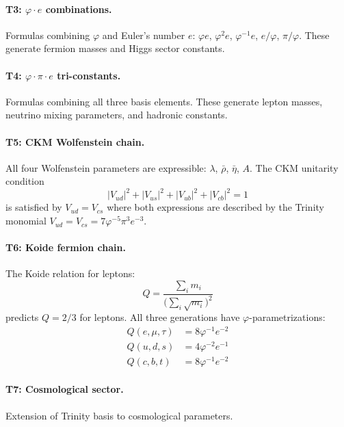 \documentclass{article}
\begin{document}
\paragraph{T3: $\varphi \cdot e$ combinations.}
Formulas combining $\varphi$ and Euler's number $e$:
$\varphi e$, $\varphi^2 e$, $\varphi^{-1}e$, $e/\varphi$, $\pi/\varphi$.
These generate fermion masses and Higgs sector constants.

\paragraph{T4: $\varphi \cdot \pi \cdot e$ tri-constants.}
Formulas combining all three basis elements. These generate lepton masses,
neutrino mixing parameters, and hadronic constants.

\paragraph{T5: CKM Wolfenstein chain.}
All four Wolfenstein parameters are expressible:
$\lambda$, $\bar{\rho}$, $\bar{\eta}$, $A$.
The CKM unitarity condition
\begin{equation}
  |V_{ud}|^2 + |V_{us}|^2 + |V_{ub}|^2 + |V_{cb}|^2 = 1
  \label{eq:ckm}
\end{equation}
is satisfied by $V_{ud} = V_{cs}$ where both expressions are described by the
Trinity monomial $V_{ud} = V_{cs} = 7\varphi^{-5}\pi^3 e^{-3}$.

\paragraph{T6: Koide fermion chain.}
The Koide relation for leptons:
\begin{equation}
  Q = \frac{\sum_i m_i}{\bigl(\sum_i \sqrt{m_i}\bigr)^2}
\end{equation}
predicts $Q = 2/3$ for leptons.
All three generations have $\varphi$-parametrizations:
\begin{align*}
  Q(e,\mu,\tau) &= 8\varphi^{-1}e^{-2} \\
  Q(u,d,s) &= 4\varphi^{-2}e^{-1} \\
  Q(c,b,t) &= 8\varphi^{-1}e^{-2}
\end{align*}

\paragraph{T7: Cosmological sector.}
Extension of Trinity basis to cosmological parameters.
\end{document}
